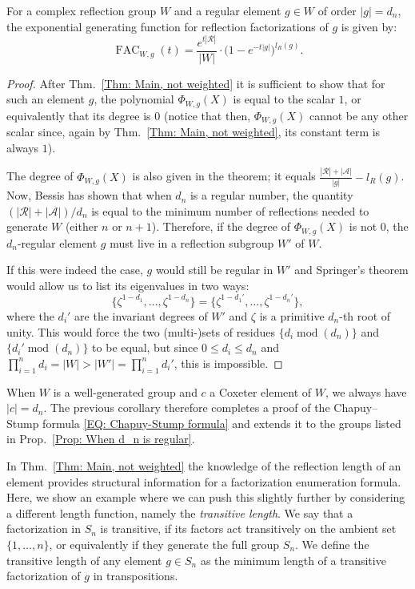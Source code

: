 \documentclass[ALCO, Unicode]{cedram}
\newcommand{\op}[1]{\operatorname{#1}}
\newcommand{\op}[1]{\operatorname{#1}}
\begin{document}
\begin{coro}\label{Cor: Chapuy-Stump for dn}
For a complex reflection group $W$ and a regular element $g\in W$ of order $|g|=d_n$, the exponential generating function for reflection factorizations of $g$ is given by:$$
\op{FAC}_{W,g}(t)=\dfrac{e^{t|\mathcal{R}|}}{|W|}\cdot\big(1-e^{-t|g|}\big)^{l_R(g)}.$$ 
\end{coro}
\begin{proof}
After Thm.~\ref{Thm: Main, not weighted} it is sufficient to show that for such an element $g$, the polynomial $\Phi_{W,g}(X)$ is equal to the scalar $1$, or equivalently that its degree is $0$ (notice that then, $\Phi_{W,g}(X)$ cannot be any other scalar since, again by Thm.~\ref{Thm: Main, not weighted}, its constant term is always $1$). 

The degree of $\Phi_{W,g}(X)$ is also given in the theorem; it equals $\frac{|\mathcal{R}|+|\mathcal{A}|}{|g|}-l_R(g)$. Now, Bessis has shown \cite[Prop.~4.2]{bes-zariski} that when $d_n$ is a regular number, the quantity $(|\mathcal{R}|+|\mathcal{A}|)/d_n$ is equal to the minimum number of reflections needed to generate $W$ (either $n$ or $n+1$). Therefore, if the degree of $\Phi_{W,g}(X)$ is not $0$, the $d_n$-regular element $g$ must  live in a reflection subgroup $W'$ of $W$.

If this were indeed the case, $g$ would still be regular in $W'$ and Springer's theorem \cite[\S32-2]{kane-book-reflection-groups} would allow us to list its eigenvalues in two ways:$$
\{\zeta^{1-d_1},\ldots,\zeta^{1-d_n}\}=\{\zeta^{1-d_1'},\ldots,\zeta^{1-d_n'}\},$$ where the $d_i'$ are the invariant degrees of $W'$ and $\zeta$ is a primitive $d_n$-th root of unity. This would force the two (multi-)sets of residues $\{d_i \op{mod}(d_n)\}$ and $\{d_i'\op{mod}(d_n)\}$ to be equal, but since $0\leq d_i\leq d_n$ and $\prod_{i=1}^n d_i=|W|>|W'|=\prod_{i=1}^n d_i'$, this is impossible.
\end{proof}

\begin{rema}
When $W$ is a well-generated group and $c$ a Coxeter element of $W$, we always have $|c|=d_n$. The previous corollary therefore completes a proof of the Chapuy--Stump formula \eqref{EQ: Chapuy-Stump formula} and extends it to the groups listed in Prop.~\ref{Prop: When d_n is regular}.
\end{rema}

In Thm.~\ref{Thm: Main, not weighted} the knowledge of the reflection length of an element provides structural information for a factorization enumeration formula. Here, we show an example where we can push this slightly further by considering a different length function, namely the {\color{blue} \emph{transitive length}}. We say that a factorization in $S_n$ is transitive, if its factors act transitively on the ambient set $\{1,\ldots,n\}$, or equivalently if they generate the full group $S_n$. We define the transitive  length of any element $g\in S_n$ as the minimum length of a transitive factorization of $g$ in transpositions.
\end{document}
